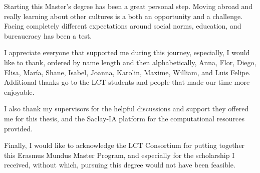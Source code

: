 

Starting this Master's degree has been a great personal step. Moving abroad and really learning about other cultures is a both an opportunity and a challenge. Facing completely different expectations around social norms, education, and bureaucracy has been a test. 


I appreciate everyone that supported me during this journey, especially, I would like to thank, ordered by name length and then alphabetically, Anna, Flor, Diego, Elisa, Mar\'ia, Shane, Isabel, Joanna, Karolin, Maxime, William, and Luis Felipe. 
Additional thanks go to the LCT students and people that made our time more enjoyable.

I also thank my supervisors for the helpful discussions and support they offered me for this thesis, and the Saclay-IA platform for the computational resources provided.

Finally, I would like to acknowledge the LCT Consortium for putting together this Erasmus Mundus Master Program, and especially for the scholarship I received, without which, pursuing this degree would not have been feasible.
